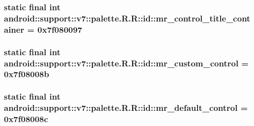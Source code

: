 \hypertarget{classandroid_1_1support_1_1v7_1_1palette_1_1_r_1_1id_08712d970c96a58e7115d5fcf343b6b7}{
\subsubsection[{mr\_\-control\_\-title\_\-container}]{\setlength{\rightskip}{0pt plus 5cm}static final int android::support::v7::palette.R.R::id::mr\_\-control\_\-title\_\-container = 0x7f080097}}
\label{classandroid_1_1support_1_1v7_1_1palette_1_1_r_1_1id_08712d970c96a58e7115d5fcf343b6b7}


\hypertarget{classandroid_1_1support_1_1v7_1_1palette_1_1_r_1_1id_436f2892ec504a7ea5b2262e6c46d529}{
\subsubsection[{mr\_\-custom\_\-control}]{\setlength{\rightskip}{0pt plus 5cm}static final int android::support::v7::palette.R.R::id::mr\_\-custom\_\-control = 0x7f08008b}}
\label{classandroid_1_1support_1_1v7_1_1palette_1_1_r_1_1id_436f2892ec504a7ea5b2262e6c46d529}


\hypertarget{classandroid_1_1support_1_1v7_1_1palette_1_1_r_1_1id_6abe02da696bf5f1d800a278d468dd88}{
\subsubsection[{mr\_\-default\_\-control}]{\setlength{\rightskip}{0pt plus 5cm}static final int android::support::v7::palette.R.R::id::mr\_\-default\_\-control = 0x7f08008c}}
\label{classandroid_1_1support_1_1v7_1_1palette_1_1_r_1_1id_6abe02da696bf5f1d800a278d468dd88}


